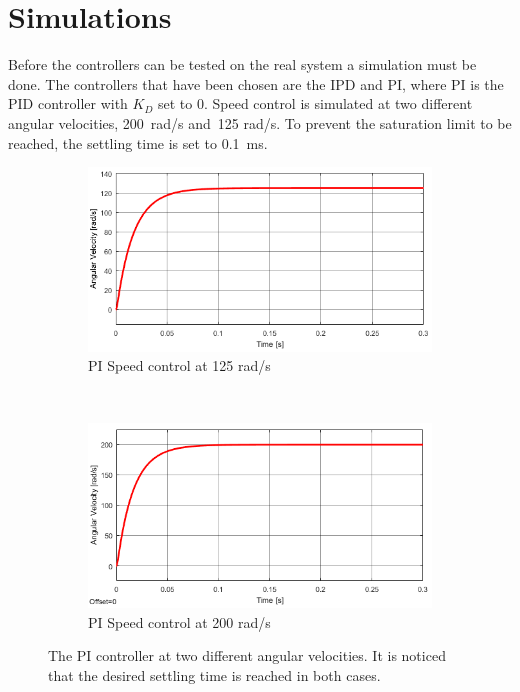 \section{Simulations}
Before the controllers can be tested on the real system a simulation must be done. The controllers that have been chosen are the IPD and PI, where PI is the PID controller with $K_D$ set to 0. Speed control is simulated at two different angular velocities, 200~rad/s and~125 rad/s. To prevent the saturation limit to be reached, the settling time is set to 0.1~ms.

\begin{figure}[h!]
	\centering
	\begin{subfigure}[b]{0.45\textwidth}
		\includegraphics[width=\textwidth]{graphics/PI_single125}
		\caption{PI Speed control at 125 rad/s}
		\label{fig:pisingle125}
	\end{subfigure}
	~ %
	\begin{subfigure}[b]{0.45\textwidth}
		\includegraphics[width=\textwidth]{graphics/PI_single200}
		\caption{PI Speed control at 200 rad/s}
		\label{fig:pisingle200}
	\end{subfigure}
	\caption{The PI controller at two different angular velocities. It is noticed that the desired settling time is reached in both cases.}\label{fig:pisingle}
\end{figure}






